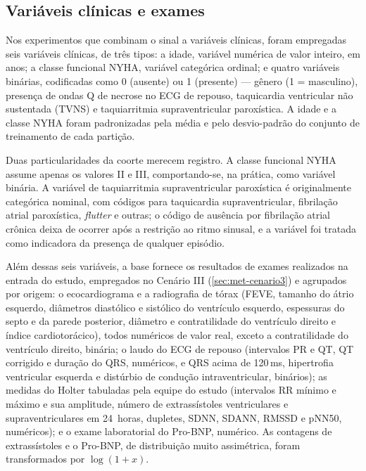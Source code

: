 \FloatBarrier

\subsection{Variáveis clínicas e exames}
\label{subsec:met-clinicas}

Nos experimentos que combinam o sinal a variáveis clínicas, foram empregadas
seis variáveis clínicas, de três tipos: a idade, variável numérica de valor inteiro, em anos; a
classe funcional \gls{NYHA}, variável categórica ordinal; e quatro variáveis
binárias, codificadas como 0 (ausente) ou 1 (presente) --- gênero (1 =
masculino), presença de ondas Q de necrose no \gls{ECG} de repouso,
taquicardia ventricular não sustentada (TVNS) e
taquiarritmia supraventricular paroxística. A idade e a classe \gls{NYHA}
foram padronizadas pela média e pelo desvio-padrão do conjunto de
treinamento de cada partição.

Duas particularidades da coorte merecem registro. A classe funcional \gls{NYHA}
assume apenas os valores II e III, comportando-se, na prática, como variável
binária. A variável de taquiarritmia supraventricular paroxística é
originalmente categórica nominal, com códigos para taquicardia
supraventricular, fibrilação atrial paroxística, \textit{flutter} e outras;
o código de ausência por fibrilação atrial crônica deixa de ocorrer após a
restrição ao ritmo sinusal, e a variável foi tratada como indicadora da
presença de qualquer episódio.



Além dessas seis variáveis, a base fornece os resultados de exames
realizados na entrada do estudo, empregados no Cenário III
(\autoref{sec:met-cenario3}) e agrupados por origem: o ecocardiograma e a
radiografia de tórax (\gls{FEVE}, tamanho do átrio esquerdo, diâmetros
diastólico e sistólico do ventrículo esquerdo, espessuras do septo e da
parede posterior, diâmetro e contratilidade do ventrículo direito e índice
cardiotorácico), todos numéricos de valor real, exceto a contratilidade do
ventrículo direito, binária; o laudo do \gls{ECG} de repouso (intervalos PR
e QT, QT corrigido e duração do QRS, numéricos, e QRS acima de 120\,ms,
hipertrofia ventricular esquerda e distúrbio de condução intraventricular,
binários); as medidas do Holter tabuladas pela equipe do estudo (intervalos
RR mínimo e máximo e sua amplitude, número de extrassístoles ventriculares e
supraventriculares em 24~horas, dupletes, \gls{SDNN}, SDANN, \gls{RMSSD} e
pNN50, numéricos); e o exame laboratorial do Pro-BNP, numérico. As
contagens de extrassístoles e o Pro-BNP, de distribuição muito assimétrica,
foram transformados por $\log(1+x)$.


